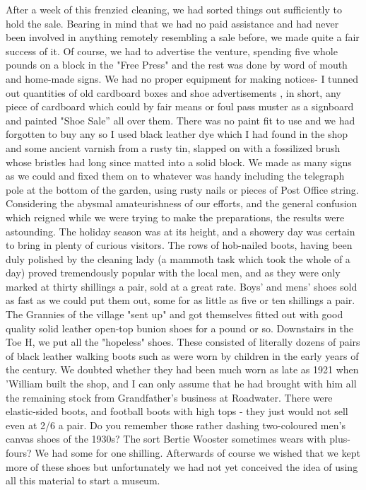 After a week of this frenzied cleaning, we had sorted things out sufficiently to hold the sale. Bearing in mind that we had no paid assistance and had never been involved in anything remotely resembling a sale before, we made quite a fair success of it. Of course, we had to advertise the venture, spending five whole pounds on a block in the "Free Press" and the rest was done by word of mouth and home-made signs. We had no proper equipment for making notices- I tunned out quantities of old cardboard boxes and shoe advertisements , in short, any piece of cardboard which could by fair means or foul pass muster as a signboard and painted "Shoe Sale” all over them. There was no paint fit to use and we had forgotten to buy any so I used black leather dye which I had found in the shop and some ancient varnish from a rusty tin, slapped on with a fossilized brush whose bristles had long since matted into a solid block. We made as many signs as we could and fixed them on to whatever was handy including the telegraph pole at the bottom of the garden, using rusty nails or pieces of Post Office string. Considering the abysmal amateurishness of our efforts, and the general confusion which reigned while we were trying to make the preparations, the results were astounding. The holiday season was at its height, and a showery day was certain to bring in plenty of curious visitors. The rows of hob-nailed boots, having been duly polished by the cleaning lady (a mammoth task which took the whole of a day) proved tremendously popular with the local men, and as they were only marked at thirty shillings a pair, sold at a great rate. Boys' and mens' shoes sold as fast as we could put them out, some for as little as five or ten shillings a pair. The Grannies of the village "sent up" and got themselves fitted out with good quality solid leather open-top bunion shoes for a pound or so. Downstairs in the Toe H, we put all the "hopeless" shoes. These consisted of literally dozens of pairs of black leather walking boots such as were worn by children in the early years of the century. We doubted whether they had been much worn as late as 1921 when 'William built the shop, and I can only assume that he had brought with him all the remaining stock from Grandfather's business at Roadwater. There were elastic-sided boots, and football boots with high tops - they just would not sell even at 2/6 a pair. Do you remember those rather dashing two-coloured men's canvas shoes of the 1930s? The sort Bertie Wooster sometimes wears with plus-fours? We had some for one shilling. Afterwards of course we wished that we kept more of these shoes but unfortunately we had not yet conceived the idea of using all this material to start a museum.

